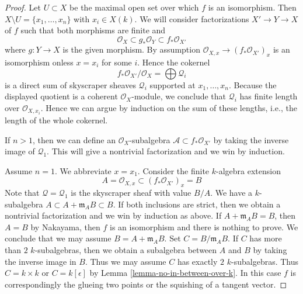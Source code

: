 \documentclass[10pt,a4paper]{amsart}
\theoremstyle{plain}
\theoremstyle{definition}
\theoremstyle{remark}
\numberwithin{equation}{subsection}
\begin{document}
\begin{proof}
Let $U \subset X$ be the maximal open set over which $f$ is an isomorphism.
Then $X \setminus U = \{x_1, \ldots, x_n\}$ with $x_i \in X(k)$.
We will consider factorizations $X' \to Y \to X$ of $f$ such that
both morphisms are finite and
$$
\mathcal{O}_X \subset g_*\mathcal{O}_Y \subset f_*\mathcal{O}_{X'}
$$
where $g : Y \to X$ is the given morphism. By assumption
$\mathcal{O}_{X, x} \to (f_*\mathcal{O}_{X'})_x$ is an isomorphism
onless $x = x_i$ for some $i$. Hence the cokernel
$$
f_*\mathcal{O}_{X'}/\mathcal{O}_X = \bigoplus \mathcal{Q}_i
$$
is a direct sum of skyscraper sheaves $\mathcal{Q}_i$ supported at
$x_1, \ldots, x_n$.
Because the displayed quotient is a coherent $\mathcal{O}_X$-module,
we conclude that $\mathcal{Q}_i$ has finite length over
$\mathcal{O}_{X, x_i}$. Hence we can argue
by induction on the sum of these lengths, i.e., the length of
the whole cokernel.

\medskip\noindent
If $n > 1$, then we can define an $\mathcal{O}_X$-subalgebra
$\mathcal{A} \subset f_*\mathcal{O}_{X'}$ by taking the inverse
image of $\mathcal{Q}_1$. This will give a nontrivial factorization
and we win by induction.

\medskip\noindent
Assume $n = 1$. We abbreviate $x = x_1$. Consider the finite
$k$-algebra extension
$$
A = \mathcal{O}_{X, x} \subset (f_*\mathcal{O}_{X'})_x = B
$$
Note that $\mathcal{Q} = \mathcal{Q}_1$ is the skyscraper sheaf
with value $B/A$.
We have a $k$-subalgebra $A \subset A + \mathfrak m_A B \subset B$.
If both inclusions are strict, then we obtain a nontrivial
factorization and we win by induction as above.
If $A + \mathfrak m_A B = B$, then $A = B$ by Nakayama, then
$f$ is an isomorphism and there is nothing to prove.
We conclude that we may assume $B = A + \mathfrak m_A B$.
Set $C = B/\mathfrak m_A B$. If $C$ has more than $2$
$k$-subalgebras, then we obtain a subalgebra between $A$
and $B$ by taking the inverse image in $B$. Thus we may
assume $C$ has exactly $2$ $k$-subalgebras. Thus $C = k \times k$
or $C = k[\epsilon]$ by Lemma \ref{lemma-no-in-between-over-k}.
In this case $f$ is correspondingly the glueing two points or the
squishing of a tangent vector.
\end{proof}
\end{document}
